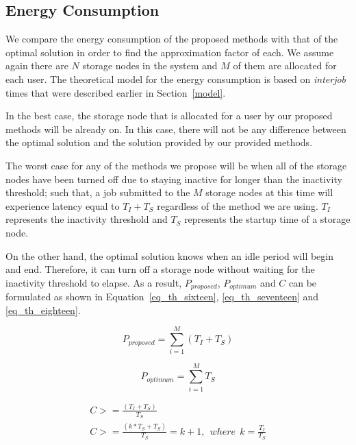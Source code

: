 \documentclass[preprint,12pt]{elsarticle}
\begin{document}
\subsection{Energy Consumption}
We compare the energy consumption of the proposed methods with that of the
optimal solution in order to find the approximation factor of each. We assume
again there are $N$ storage nodes in the system and $M$ of them are allocated
for each user. The theoretical model for the energy consumption is based
on \textit{interjob} times that were described earlier in Section~\ref{model}.

In the best case, the storage node that is allocated for a user by our proposed
methods will be already on. In this case, there will not be any difference
between the optimal solution and the solution provided by our provided methods.

The worst case for any of the methods we propose will be when all of the
storage nodes have been turned off due to staying inactive for longer than
the inactivity threshold; such that, a job submitted to the $M$ storage nodes
at this time will experience latency equal to $T_I + T_S$ regardless
of the method we are using. $T_I$ represents the inactivity threshold and
$T_S$ represents the startup time of a storage node.

On the other hand, the optimal solution knows when an idle period will begin and
end. Therefore, it can turn off a storage node without waiting for the inactivity
threshold to elapse. As a result, $P_{proposed}$, $P_{optimum}$ and $C$ can be
formulated as shown in Equation~\eqref{eq_th_sixteen}, \eqref{eq_th_seventeen}
and \eqref{eq_th_eighteen}.

\begin{equation}
P_{proposed} = \sum\limits_{i=1}^{M} (T_{I} + T_{S})
\label{eq_th_sixteen}
\end{equation}
\hfill

\begin{equation}
P_{optimum} = \sum\limits_{i=1}^{M} T_{S}
\label{eq_th_seventeen}
\end{equation}
\hfill

\begin{equation}
\begin{gathered}
C >= \frac{(T_{I} + T_{S})}{T_{S}} \\
C >= \frac{(k * T_{S} + T_{S})}{T_{S}} = k + 1,\ \ where\ \ k = \frac{T_{I}}{T_{S}}
\label{eq_th_eighteen}
\end{gathered}
\end{equation}
\hfill
\end{document}
